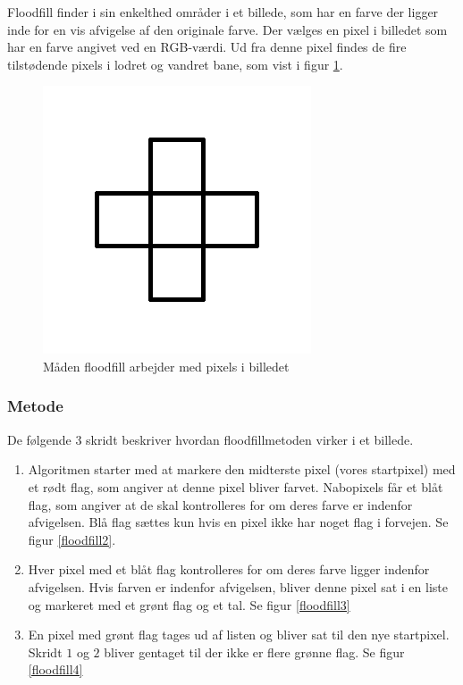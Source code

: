 {
Floodfill finder i sin enkelthed områder i et billede, som har en farve
der ligger inde for en vis afvigelse af den originale farve. Der vælges
en pixel i billedet som har en farve angivet ved en RGB-værdi. Ud fra
denne pixel findes de fire tilstødende pixels i lodret og vandret bane,
som vist i figur \ref{floodfill1}.

\begin{figure}[!h]
    \begin{center}
        \includegraphics[scale=0.42,angle=0]{afsnit/vores_implementation/billeder/flood_fill/floodfill1}
    \end{center}
    \caption[]{Måden floodfill arbejder med pixels i billedet}
    \label{floodfill1}
\end{figure}

\subsubsection{Metode}
De følgende 3 skridt beskriver hvordan floodfillmetoden virker i et
billede.

\begin{enumerate}
    \item Algoritmen starter med at markere den midterste pixel (vores
        startpixel) med et rødt flag, som angiver at denne pixel bliver
        farvet. Nabopixels får et blåt flag, som angiver at de skal
        kontrolleres for om deres farve er indenfor afvigelsen. Blå flag
        sættes kun hvis en pixel ikke har noget flag i forvejen. Se
        figur \ref{floodfill2}.
    \item Hver pixel med et blåt flag kontrolleres for om deres
        farve ligger indenfor afvigelsen. Hvis farven er indenfor
        afvigelsen, bliver denne pixel sat i en liste og markeret med et
        grønt flag og et tal. Se figur \ref{floodfill3}
    \item En pixel med grønt flag tages ud af listen og bliver sat til
        den nye startpixel. Skridt $1$ og $2$ bliver gentaget til der
        ikke er flere grønne flag. Se figur \ref{floodfill4}
\end{enumerate}

}
